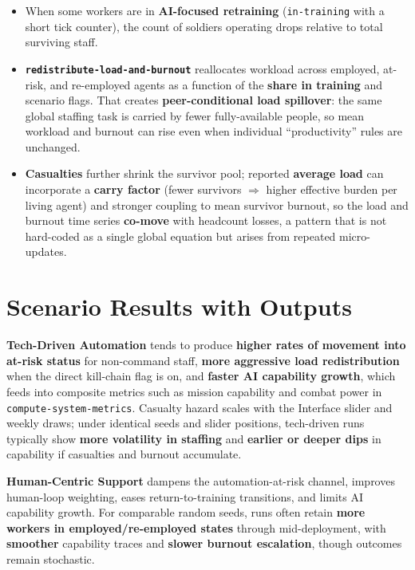 \documentclass[11pt,letterpaper]{article}
\begin{document}
\begin{itemize}[leftmargin=*]
  \item When some workers are in \textbf{AI-focused retraining} (\texttt{in-training} with a short tick counter), the count of soldiers operating drops relative to total surviving staff.
  \item \textbf{\texttt{redistribute-load-and-burnout}} reallocates workload across employed, at-risk, and re-employed agents as a function of the \textbf{share in training} and scenario flags. That creates \textbf{peer-conditional load spillover}: the same global staffing task is carried by fewer fully-available people, so mean workload and burnout can rise even when individual ``productivity'' rules are unchanged.
  \item \textbf{Casualties} further shrink the survivor pool; reported \textbf{average load} can incorporate a \textbf{carry factor} (fewer survivors $\Rightarrow$ higher effective burden per living agent) and stronger coupling to mean survivor burnout, so the load and burnout time series \textbf{co-move} with headcount losses, a pattern that is not hard-coded as a single global equation but arises from repeated micro-updates.
\end{itemize}

\section{Scenario Results with Outputs}

\textbf{Tech-Driven Automation} tends to produce \textbf{higher rates of movement into at-risk status} for non-command staff, \textbf{more aggressive load redistribution} when the direct kill-chain flag is on, and \textbf{faster AI capability growth}, which feeds into composite metrics such as mission capability and combat power in \texttt{compute-system-metrics}. Casualty hazard scales with the Interface slider and weekly draws; under identical seeds and slider positions, tech-driven runs typically show \textbf{more volatility in staffing} and \textbf{earlier or deeper dips} in capability if casualties and burnout accumulate.

\textbf{Human-Centric Support} dampens the automation-at-risk channel, improves human-loop weighting, eases return-to-training transitions, and limits AI capability growth. For comparable random seeds, runs often retain \textbf{more workers in employed/re-employed states} through mid-deployment, with \textbf{smoother} capability traces and \textbf{slower burnout escalation}, though outcomes remain stochastic.
\end{document}
